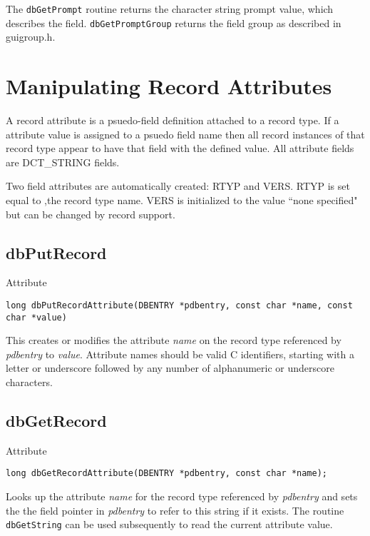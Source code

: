 The \verb|dbGetPrompt| routine returns the character string prompt value, which describes the field. \verb|dbGetPromptGroup| 
returns the field group as described in guigroup.h.

\section{Manipulating Record Attributes}

A record attribute is a psuedo-field definition attached to a record type. If a attribute value is assigned to a psuedo field 
name then all record instances of that record type appear to have that field with the defined value. All attribute fields are 
DCT\_STRING fields.

Two field attributes are automatically created: RTYP and VERS. RTYP is set equal to ,the record type name. VERS is 
initialized to the value ``none specified" but can be changed by record support.

\subsection{dbPutRecord}

Attribute

\begin{verbatim}
long dbPutRecordAttribute(DBENTRY *pdbentry, const char *name, const char *value)
\end{verbatim}

This creates or modifies the attribute \emph{name} on the record type referenced by \emph{pdbentry} to \emph{value}. Attribute names should be 
valid C identifiers, starting with a letter or underscore followed by any number of alphanumeric or underscore characters.

\subsection{dbGetRecord}

Attribute

\begin{verbatim}
long dbGetRecordAttribute(DBENTRY *pdbentry, const char *name);
\end{verbatim}

Looks up the attribute \emph{name} for the record type referenced by \emph{pdbentry} and sets the the field pointer in \emph{pdbentry} to refer to 
this string if it exists. The routine \verb|dbGetString| can be used subsequently to read the current attribute value.

